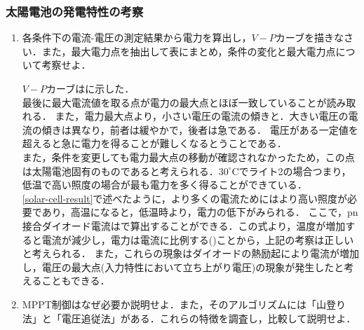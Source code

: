\clearpage
\subsubsection{太陽電池の発電特性の考察}
\begin{enumerate}[(1)]
	\item 各条件下の電流-電圧の測定結果から電力を算出し，$V-P$カーブを描きなさい．また，最大電力点を抽出して表にまとめ，条件の変化と最大電力点について考察せよ．
	
	$V-P$カーブはに示した．\\
	最後に最大電流値を取る点が電力の最大点とほぼ一致していることが読み取れる．
	また，電力最大点より，小さい電圧の電流の傾きと．大きい電圧の電流の傾きは異なり，前者は緩やかで，後者は急である．
	電圧がある一定値を超えると急に電力を得ることが難しくなるとうことである．\\
	また，条件を変更しても電力最大点の移動が確認されなかったため，この点は太陽電池固有のものであると考えられる．$30^{\circ}$Cでライト2の場合つまり，低温で高い照度の場合が最も電力を多く得ることができている．\\
	\ref{solar-cell-result}で述べたように，より多くの電流ためにはより高い照度が必要であり，高温になると，低温時より，電力の低下がみられる．
	ここで，pn接合ダイオード電流はで算出することができる．この式より，温度が増加すると電流が減少し，電力は電流に比例する()ことから，上記の考察は正しいと考えられる．
	また，これらの現象はダイオードの熱励起により電流が増加し，電圧の最大点(入力特性において立ち上がり電圧)の現象が発生したと考えることもできる．
	\item MPPT制御はなぜ必要か説明せよ．また，そのアルゴリズムには「山登り法」と「電圧追従法」がある．これらの特徴を調査し，比較して説明せよ．
	

\end{enumerate}
